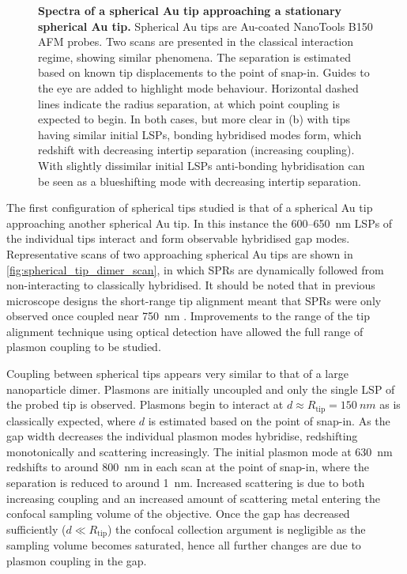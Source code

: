 \documentclass[a4paper]{article}
\begin{document}
\begin{figure}[bt]
\caption[Spectra of a spherical Au tip approaching a stationary spherical Au tip]{\textbf{Spectra of a spherical Au tip approaching a stationary spherical Au tip.} Spherical Au tips are Au-coated NanoTools B150 AFM probes. Two scans are presented in the classical interaction regime, showing similar phenomena. The separation is estimated based on known tip displacements to the point of snap-in. Guides to the eye are added to highlight mode behaviour. Horizontal dashed lines indicate the radius separation, at which point coupling is expected to begin. In both cases, but more clear in (b) with tips having similar initial LSPs, bonding hybridised modes form, which redshift with decreasing intertip separation (increasing coupling). With slightly dissimilar initial LSPs anti-bonding hybridisation can be seen as a blueshifting mode with decreasing intertip separation.}
\label{fig:spherical_tip_dimer_scan}
\end{figure}

The first configuration of spherical tips studied is that of a spherical Au tip approaching another spherical Au tip. In this instance the 600--\SI{650}{nm} LSPs of the individual tips interact and form observable hybridised gap modes. Representative scans of two approaching spherical Au tips are shown in \autoref{fig:spherical_tip_dimer_scan}, in which SPRs are dynamically followed from non-interacting to classically hybridised. It should be noted that in previous microscope designs the short-range tip alignment meant that SPRs were only observed once coupled near \SI{750}{nm} \cite{savage2012}. Improvements to the range of the tip alignment technique using optical detection have allowed the full range of plasmon coupling to be studied.

Coupling between spherical tips appears very similar to that of a large nanoparticle dimer. Plasmons are initially uncoupled and only the single LSP of the probed tip is observed. Plasmons begin to interact at $d \approx R_{\mathrm{tip}} = \SI{150}{nm}$ as is classically expected, where $d$ is estimated based on the point of snap-in. As the gap width decreases the individual plasmon modes hybridise, redshifting monotonically and scattering increasingly. The initial plasmon mode at \SI{630}{nm} redshifts to around \SI{800}{nm} in each scan at the point of snap-in, where the separation is reduced to around \SI{1}{nm}. Increased scattering is due to both increasing coupling and an increased amount of scattering metal entering the confocal sampling volume of the objective. Once the gap has decreased sufficiently ($d \ll R_{\mathrm{tip}}$) the confocal collection argument is negligible as the sampling volume becomes saturated, hence all further changes are due to plasmon coupling in the gap.
\end{document}
